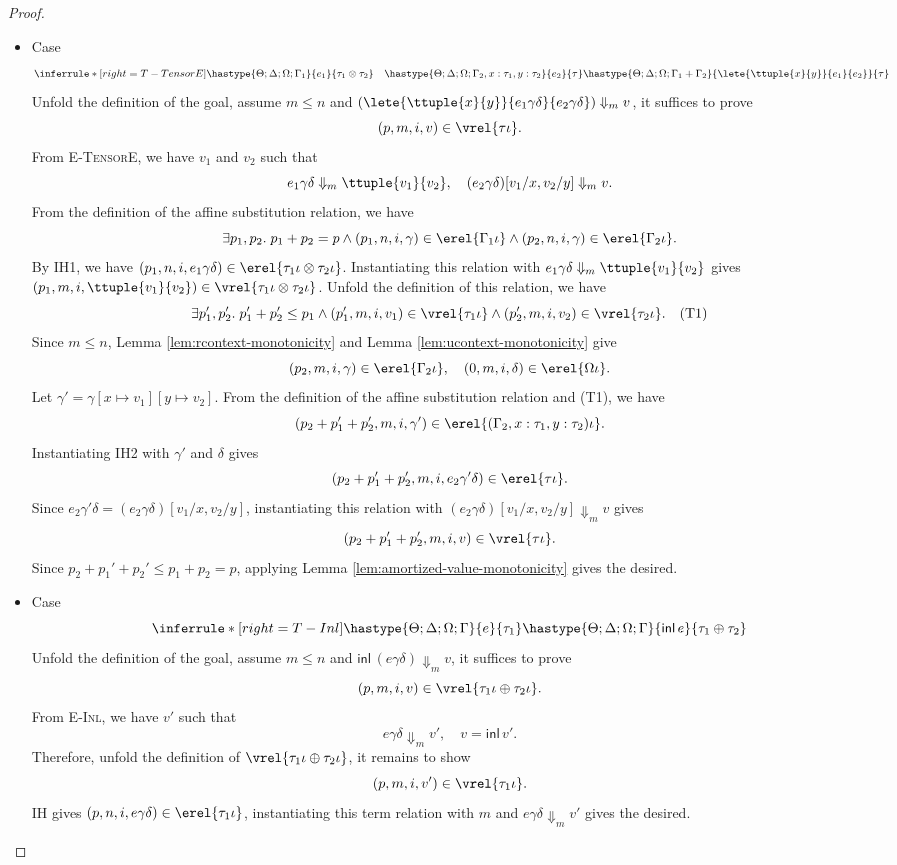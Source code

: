 \begin{proof}
\begin{itemize}
\item Case
\[
  \inferrule*[right=T-TensorE]
    {\hastype{\Theta;\Delta;\Omega;\Gamma_1}{e_1}{\tau_1\otimes\tau_2}
      \quad\hastype{\Theta;\Delta;\Omega;\Gamma_2,x:\tau_1,y:\tau_2}{e_2}{\tau}}
    {\hastype{\Theta;\Delta;\Omega;\Gamma_1+\Gamma_2}
      {\lete{\ttuple{x}{y}}{e_1}{e_2}}{\tau}}
\]
Unfold the definition of the goal, assume $m\leq n$ and
$(\lete{\ttuple{x}{y}}{e_1\gamma\delta}{e_2\gamma\delta})\Downarrow_m v$, it suffices to prove
\[(p, m, i, v)\in\vrel{\tau\iota}.\]
From \textsc{E-TensorE}, we have $v_1$ and $v_2$ such that
\[
  e_1\gamma\delta\Downarrow_m\ttuple{v_1}{v_2},
  \quad (e_2\gamma\delta)[v_1/x,v_2/y]\Downarrow_m v.
\]
From the definition of the affine substitution relation, we have
\[
  \exists p_1, p_2.\;p_1 + p_2= p \land
  (p_1,n,i,\gamma) \in \erel{\Gamma_1\iota} \land
  (p_2,n, i, \gamma) \in \erel{\Gamma_2\iota}.
\]
By IH1, we have $(p_1, n, i, e_1\gamma\delta)\in\erel{\tau_1\iota\otimes\tau_2\iota}$.
Instantiating this relation with $e_1\gamma\delta\Downarrow_m\ttuple{v_1}{v_2}$ gives
$(p_1, m, i, \ttuple{v_1}{v_2})\in\vrel{\tau_1\iota\otimes\tau_2\iota}$.
Unfold the definition of this relation, we have
\[
  \exists p_1', p_2'.\;p_1'+p_2' \leq p_1 \land
  (p_1', m, i, v_1)\in\vrel{\tau_1\iota} \land
  (p_2', m, i, v_2)\in\vrel{\tau_2\iota}. \quad (\text{T1})
\]
Since $m \leq n$, Lemma \ref{lem:rcontext-monotonicity} and Lemma \ref{lem:ucontext-monotonicity} give
\[(p_2, m, i, \gamma)\in\erel{\Gamma_2\iota}, \quad (0, m, i, \delta)\in\erel{\Omega\iota}.\]
Let $\gamma' = \gamma[x\mapsto v_1][y\mapsto v_2]$. From the definition of the affine substitution
relation and (T1), we have
\[(p_2+p_1'+p_2', m, i, \gamma')\in\erel{(\Gamma_2, x:\tau_1, y:\tau_2)\iota}.\]
Instantiating IH2 with $\gamma'$ and $\delta$ gives
\[(p_2+p_1'+p_2', m, i, e_2\gamma'\delta)\in\erel{\tau\iota}.\]
Since $e_2\gamma'\delta = (e_2\gamma\delta)[v_1/x,v_2/y]$, instantiating this relation with
$(e_2\gamma\delta)[v_1/x,v_2/y]\Downarrow_m v$ gives
\[(p_2+p_1'+p_2', m, i, v)\in\vrel{\tau\iota}.\]
Since $p_2+p_1'+p_2' \leq p_1+p_2 = p$, applying Lemma \ref{lem:amortized-value-monotonicity} gives the desired.

\item Case
\[
  \inferrule*[right=T-Inl]
        {\hastype{\Theta;\Delta;\Omega;\Gamma}{e}{\tau_1}}
        {\hastype{\Theta;\Delta;\Omega;\Gamma}{\mathsf{inl}\,e}{\tau_1\oplus\tau_2}}
\]
Unfold the definition of the goal, assume $m\leq n$ and
$\mathsf{inl}\,(e\gamma\delta)\Downarrow_m v$, it suffices to prove
\[(p, m, i, v)\in\vrel{\tau_1\iota\oplus\tau_2\iota}.\]
From \textsc{E-Inl}, we have $v'$ such that
\[
  e\gamma\delta\Downarrow_m v', \quad v=\mathsf{inl}\,v'.
\]
Therefore, unfold the definition of $\vrel{\tau_1\iota\oplus\tau_2\iota}$, it remains to show
\[(p, m, i, v') \in \vrel{\tau_1\iota}.\]
IH gives $(p, n, i, e\gamma\delta) \in \erel{\tau_1\iota}$, instantiating this
term relation with $m$ and $e\gamma\delta\Downarrow_m v'$ gives the desired.


\end{itemize}
\end{proof}
